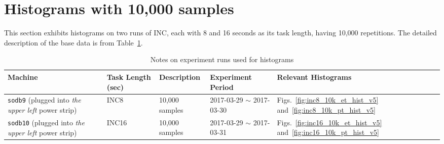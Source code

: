 \section{Histograms with 10,000 samples~\label{sec:sodb9_10k_hist}} 
This section exhibits histograms on two runs of 
INC, each with 8 and 16 seconds as its task length, having 10,000 repetitions.
The detailed description of the base data is from Table~\ref{tab:exp_notes3}.

\begin{table}[h]
\begin{center}
\begin{tabular}{|p{2cm}|p{3cm}|p{3cm}|p{4cm}|p{3.5cm}|} \hline
Machine & Task Length (sec) & Description & Experiment Period & Relevant \linebreak Histograms\\ \hline
{\tt sodb9} (plugged into {\em the upper left} power strip) &  INC8 & 10,000 samples & 2017-03-29 $\sim$ 2017-03-30 & Figs.~\ref{fig:inc8_10k_et_hist_v5} and~\ref{fig:inc8_10k_pt_hist_v5}\\ \hline
{\tt sodb10} (plugged into {\em the upper left} power strip) &  INC16 & 10,000 samples & 2017-03-29 $\sim$ 2017-03-31 & 
Figs.~\ref{fig:inc16_10k_et_hist_v5} and~\ref{fig:inc16_10k_pt_hist_v5}\\ \hline
\end{tabular}
\end{center}
\vspace{-.2in}
\caption{Notes on experiment runs used for histograms\label{tab:exp_notes3}}
\end{table}

